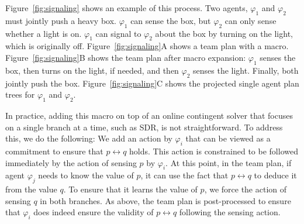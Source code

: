 \documentclass[letterpaper]{article} %
\theoremstyle{definition}
\begin{document}
Figure~\ref{fig:signaling} shows an example of this process. Two agents, $\varphi_1$ and $\varphi_2$ must jointly push a heavy box. $\varphi_1$ can sense the box, but $\varphi_2$ can only sense whether a light is on. $\varphi_1$ can  signal to $\varphi_2$ about the box by turning on the light, which is originally off. Figure~\ref{fig:signaling}A shows a team plan with a macro.
Figure~\ref{fig:signaling}B shows the team plan after macro expansion: $\varphi_1$ senses the box, then turns on the light, if needed, and then $\varphi_2$ senses the light. Finally, both jointly push the box.
Figure~\ref{fig:signaling}C shows the projected single agent plan trees for $\varphi_1$ and $\varphi_2$.  %



In practice, adding this macro on top of an online contingent solver that focuses on a single branch at a time, such as SDR, is not straightforward. To address this, we do the following:
We add an action by $\varphi_i$ that can be viewed as a commitment to ensure that $p\leftrightarrow q$ holds. This action is constrained to be followed immediately by the action of sensing $p$ by $\varphi_i$.
At this point, in the team plan, if agent $\varphi_j$ needs to know the value of $p$, it can use the fact that $p\leftrightarrow q$ to deduce it from the value $q$. To ensure that it learns the value of $p$, we force the action of sensing $q$ in both branches.
As above, the team plan is post-processed to ensure that $\varphi_i$ does indeed ensure the validity of $p\leftrightarrow q$ following the sensing action.
\end{document}
